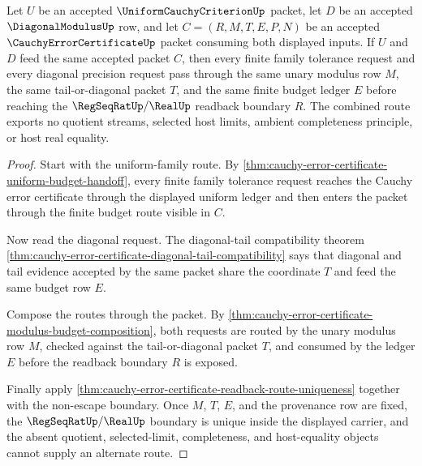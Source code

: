 \begin{theorem}
\label{thm:cauchy-error-certificate-uniform-diagonal-compatibility}
Let $U$ be an accepted $\UniformCauchyCriterionUp$ packet, let $D$ be an accepted $\DiagonalModulusUp$ row, and let $C=(R,M,T,E,P,N)$ be an accepted $\CauchyErrorCertificateUp$ packet consuming both displayed inputs. If $U$ and $D$ feed the same accepted packet $C$, then every finite family tolerance request and every diagonal precision request pass through the same unary modulus row $M$, the same tail-or-diagonal packet $T$, and the same finite budget ledger $E$ before reaching the $\RegSeqRatUp/\RealUp$ readback boundary $R$. The combined route exports no quotient streams, selected host limits, ambient completeness principle, or host real equality.
\end{theorem}
\begin{proof}
Start with the uniform-family route. By \autoref{thm:cauchy-error-certificate-uniform-budget-handoff}, every finite family tolerance request reaches the Cauchy error certificate through the displayed uniform ledger and then enters the packet through the finite budget route visible in $C$.

Now read the diagonal request. The diagonal-tail compatibility theorem \autoref{thm:cauchy-error-certificate-diagonal-tail-compatibility} says that diagonal and tail evidence accepted by the same packet share the coordinate $T$ and feed the same budget row $E$.

Compose the routes through the packet. By \autoref{thm:cauchy-error-certificate-modulus-budget-composition}, both requests are routed by the unary modulus row $M$, checked against the tail-or-diagonal packet $T$, and consumed by the ledger $E$ before the readback boundary $R$ is exposed.

Finally apply \autoref{thm:cauchy-error-certificate-readback-route-uniqueness} together with the non-escape boundary. Once $M$, $T$, $E$, and the provenance row are fixed, the $\RegSeqRatUp/\RealUp$ boundary is unique inside the displayed carrier, and the absent quotient, selected-limit, completeness, and host-equality objects cannot supply an alternate route.
\end{proof}

